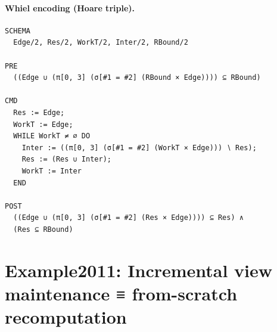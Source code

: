 \documentclass[10pt]{article}
\begin{document}
\paragraph{Whiel encoding (Hoare triple).}

\begin{Verbatim}[fontsize=\scriptsize,breaklines=true,breakanywhere=true,frame=single,framesep=1.5mm]
SCHEMA
  Edge/2, Res/2, WorkT/2, Inter/2, RBound/2

PRE
  ((Edge ∪ (π[0, 3] (σ[#1 = #2] (RBound × Edge)))) ⊆ RBound)

CMD
  Res := Edge;
  WorkT := Edge;
  WHILE WorkT ≠ ∅ DO
    Inter := ((π[0, 3] (σ[#1 = #2] (WorkT × Edge))) ∖ Res);
    Res := (Res ∪ Inter);
    WorkT := Inter
  END

POST
  ((Edge ∪ (π[0, 3] (σ[#1 = #2] (Res × Edge)))) ⊆ Res) ∧
  (Res ⊆ RBound)
\end{Verbatim}

\Needspace{0.45\textheight}

\section{Example2011: Incremental view maintenance ≡ from-scratch recomputation}\label{case:Example2011}
\end{document}
